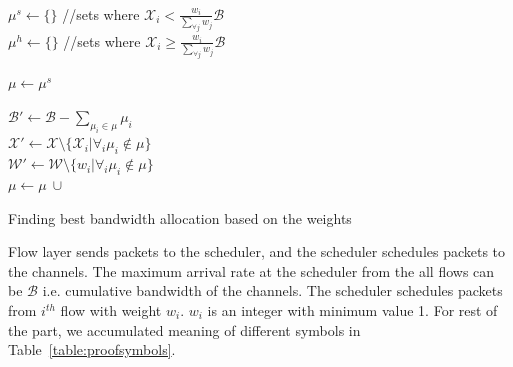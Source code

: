 \begin{algorithm*}[!ht]
	\nonl{}\\
	\Indp
	$\mu^s \gets \{\}$ //sets where $\mathcal{X}_i < \frac{w_i}{\sum_{\forall j}w_j} \mathcal{B}$\\
	$\mu^h \gets \{\}$ //sets where $\mathcal{X}_i \ge \frac{w_i}{\sum_{\forall j}w_j} \mathcal{B}$ \\
	
	$\mu \gets \mu^s$
	
	$\mathcal{B}' \gets \mathcal{B} - \sum_{ \mu_i \in \mu} \mu_i$ \\
	$\mathcal{X}' \gets \mathcal{X} \setminus \{\mathcal{X}_i | \forall_i \mu_i \notin \mu\}$ \\
	$\mathcal{W}' \gets \mathcal{W} \setminus \{w_i | \forall_i \mu_i \notin \mu\}$ \\

	$\mu \gets \mu\ \cup$ \\
	\Return{$\mu$}
\caption{\label{algo:findTheBandwidth} Finding best bandwidth allocation based on the weights}
\end{algorithm*}


Flow layer sends packets to the scheduler, and the scheduler schedules packets to the channels. The maximum arrival rate at the scheduler from the all flows can be $\mathcal{B}$ i.e. cumulative bandwidth of the channels. The scheduler schedules packets from $i^{th}$ flow with weight $w_i$. $w_i$ is an integer with minimum value 1. For rest of the part, we accumulated meaning of different symbols in Table~\ref{table:proofsymbols}.


